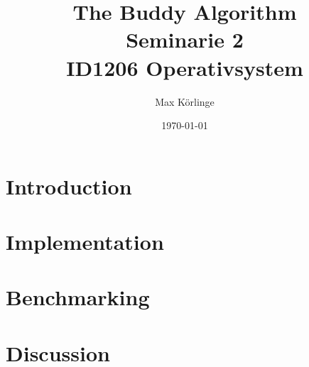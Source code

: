 \documentclass{article}
\begin{document}
\title{The Buddy Algorithm \\
\medskip
\large Seminarie 2 \\ 
\medskip
ID1206 Operativsystem }
\author{Max Körlinge}
\date{\today}
\maketitle


\section{Introduction}

\section{Implementation}

\section{Benchmarking}

\section{Discussion}
\end{document}

